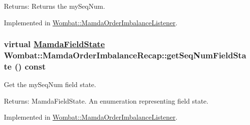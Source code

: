 \begin{Desc}
\item[Returns:]Returns the my\-Seq\-Num. \end{Desc}


Implemented in \hyperlink{classWombat_1_1MamdaOrderImbalanceListener_dc73bf6c66194774ffd211ab9fb44b6c}{Wombat::Mamda\-Order\-Imbalance\-Listener}.\hypertarget{classWombat_1_1MamdaOrderImbalanceRecap_5a26737b3bf2abcb981786581875357c}{
\subsubsection[getSeqNumFieldState]{\setlength{\rightskip}{0pt plus 5cm}virtual \hyperlink{namespaceWombat_93aac974f2ab713554fd12a1fa3b7d2a}{Mamda\-Field\-State} Wombat::Mamda\-Order\-Imbalance\-Recap::get\-Seq\-Num\-Field\-State () const}}
\label{classWombat_1_1MamdaOrderImbalanceRecap_5a26737b3bf2abcb981786581875357c}


Get the my\-Seq\-Num field state. 

\begin{Desc}
\item[Returns:]Mamda\-Field\-State. An enumeration representing field state. \end{Desc}


Implemented in \hyperlink{classWombat_1_1MamdaOrderImbalanceListener_59ef970a6b416d746105d9e766c1d1a8}{Wombat::Mamda\-Order\-Imbalance\-Listener}.